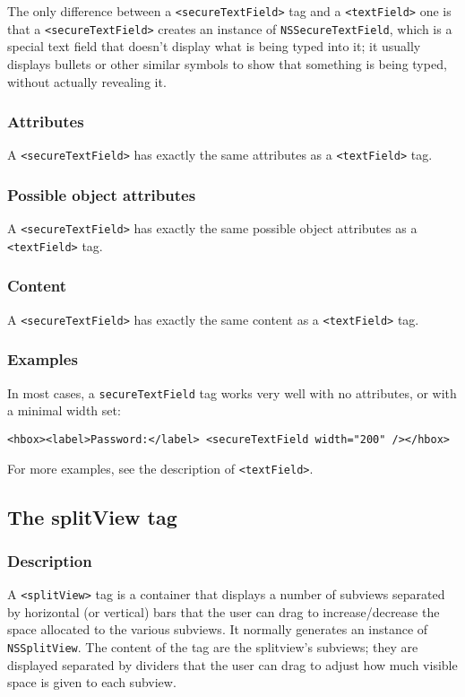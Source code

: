 The only difference between a \texttt{<secureTextField>} tag and a
\texttt{<textField>} one is that a \texttt{<secureTextField>} creates
an instance of \texttt{NSSecureTextField}, which is a special text
field that doesn't display what is being typed into it; it usually
displays bullets or other similar symbols to show that something is
being typed, without actually revealing it.

\subsubsection{Attributes}
A \texttt{<secureTextField>} has exactly the same attributes as a
\texttt{<textField>} tag.

\subsubsection{Possible object attributes}
A \texttt{<secureTextField>} has exactly the same possible object
attributes as a \texttt{<textField>} tag.

\subsubsection{Content}
A \texttt{<secureTextField>} has exactly the same content as a
\texttt{<textField>} tag.

\subsubsection{Examples}
In most cases, a \texttt{secureTextField} tag works very well with no
attributes, or with a minimal width set:
\begin{verbatim}
<hbox><label>Password:</label> <secureTextField width="200" /></hbox>
\end{verbatim}
For more examples, see the description of \texttt{<textField>}.

\subsection{The splitView tag}

\subsubsection{Description}

A \texttt{<splitView>} tag is a container that displays a number of
subviews separated by horizontal (or vertical) bars that the user can
drag to increase/decrease the space allocated to the various subviews.
It normally generates an instance of \texttt{NSSplitView}.  The
content of the tag are the splitview's subviews; they are displayed
separated by dividers that the user can drag to adjust how much
visible space is given to each subview.

